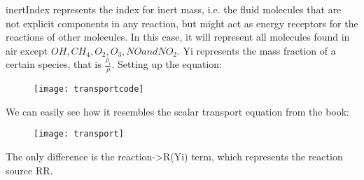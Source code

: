 inertIndex represents the index for inert mass, i.e. the fluid molecules that are not explicit components in any reaction, but might act as energy receptors for the reactions of other molecules. In this case, it will represent all molecules found in air except $OH, CH_4, O_2, O_3, NO and NO_2$.
\vspace{\baselineskip}
Yi represents the mass fraction of a certain species, that is $\frac{\rho_i}{\rho}$.
\vspace{\baselineskip}
Setting up the equation:

\begin{figure}[H]
\centering
\texttt{[image: transportcode]}
\end{figure}

We can easily see how it resembles the scalar transport equation from the book:
\begin{figure}[H]
\centering
\texttt{[image: transport]}
\end{figure}
The only difference is the reaction->R(Yi) term, which represents the reaction source RR.

